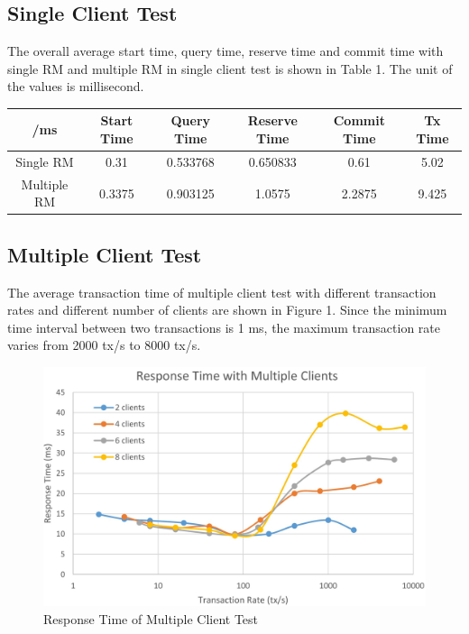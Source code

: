 \documentclass[a4paper, 11pt]{article}
\begin{document}
\subsection{Single Client Test}
\vspace{-10pt}
      The overall average start time, query time, reserve time and commit time with single RM and multiple RM in single client test is shown in Table 1. The unit of the values is millisecond.
\begin{table}[H]
\centering
\label{tab:Table_1}
\begin{tabular}{| c | c | c | c | c | c |}
	\hline
	/ms & Start Time & Query Time & Reserve Time & Commit Time & Tx Time \\ \hline
	Single RM & 0.31 & 0.533768 & 0.650833 & 0.61 & 5.02 \\ \hline
	Multiple RM & 0.3375 & 0.903125 & 1.0575 & 2.2875 & 9.425 \\ \hline
\end{tabular}
\vspace{-5pt}
\end{table}
\vspace{-35pt}
\subsection{Multiple Client Test}
\vspace{-10pt}
      The average transaction time of multiple client test with different transaction rates and different number of clients are shown in Figure 1. Since the minimum time interval between two transactions is 1 ms, the maximum transaction rate varies from 2000 tx/s to 8000 tx/s.
\vspace{-5pt}
\begin{figure}[H]
    \centering
    \includegraphics[width=0.6\linewidth]{test_results-1.jpg}
    \vspace{-5pt}
    \caption{Response Time of Multiple Client Test}
    \label{fig:Figure_1}
    \vspace{-10pt}
\end{figure}
\vspace{-10pt}
\end{document}
